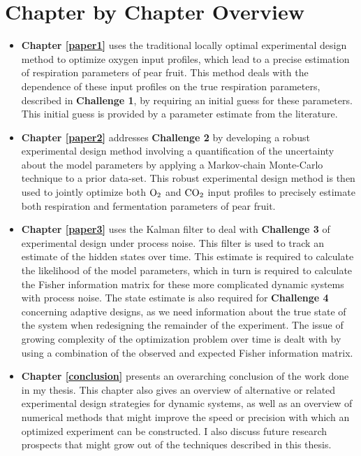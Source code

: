 \section{Chapter by Chapter Overview}
\begin{itemize}
	\item \textbf{Chapter \ref{paper1}} uses the traditional locally optimal experimental design method to optimize oxygen input profiles, which lead to a precise estimation of respiration parameters {\color{red}of pear fruit}. This method deals with the dependence of these input profiles on the true respiration parameters, described in \textbf{Challenge 1}, by requiring an initial guess for these parameters. This initial guess is provided by a parameter estimate from the literature.
	\item \textbf{Chapter \ref{paper2}} addresses \textbf{Challenge 2} by developing a robust experimental design method involving a quantification of the uncertainty about the model parameters by applying a Markov-chain Monte-Carlo technique to a prior data-set. This robust experimental design method is then used to jointly optimize both  $\text{O}_2$ and $\text{CO}_2$ input profiles to precisely estimate both respiration and fermentation parameters of pear fruit.
	\item \textbf{Chapter \ref{paper3}} uses the Kalman filter to deal with \textbf{Challenge 3} of experimental design under process noise. This filter is used to track an estimate of the hidden states over time. This estimate is required to calculate the likelihood of the model parameters, which in turn is required to calculate the Fisher information matrix for these more complicated dynamic systems with process noise. The state estimate is also required for \textbf{Challenge 4} concerning adaptive designs, as we need information about the true state of the system when redesigning the remainder of the experiment. The issue of growing complexity of the optimization problem over time is dealt with by using a combination of the observed and expected Fisher information matrix.
	\item \textbf{Chapter \ref{conclusion}} {\color{red}presents} an overarching conclusion of the work done in my thesis. This chapter also gives an overview of alternative or related experimental design strategies for dynamic systems, as well as an overview of numerical methods that might improve the speed or precision with which an optimized experiment can be constructed. I also discuss future research prospects that might grow out of the techniques described in this thesis.
\end{itemize}